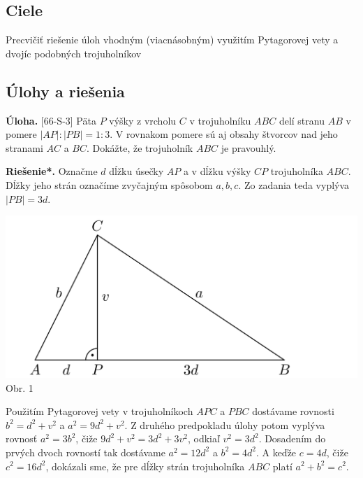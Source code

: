 \documentclass[11pt,a4paper,oneside,final]{book}
\newcommand{\ul}{\textbf{Úloha.} }
\newcommand{\rieh}{\textbf{Riešenie*.} }
\begin{document}
\subsection*{Ciele}
Precvičiť riešenie úloh vhodným (viacnásobným) využitím Pytagorovej vety a dvojíc podobných trojuholníkov

\subsection*{Úlohy a riešenia}
\begin{tcolorbox}[breakable,notitle,boxrule=0pt,colback=light-gray,colframe=light-gray]\ul [66-S-3] Päta $P$ výšky z vrcholu $C$ v trojuholníku $ABC$ delí stranu $AB$ v pomere $|AP| : |PB|= 1 : 3$. V rovnakom pomere sú aj obsahy štvorcov nad jeho stranami $AC$ a $BC$.
Dokážte, že trojuholník $ABC$ je pravouhlý.
\end{tcolorbox}

\rieh Označme $d$ dĺžku úsečky $AP$ a v dĺžku výšky $CP$ trojuholníka $ABC$. Dĺžky jeho strán označíme zvyčajným spôsobom $a, b, c$. Zo zadania teda vyplýva $|PB| = 3d$.
\begin{center}
\includegraphics{66S3}\\

Obr. 1
\end{center}
Použitím Pytagorovej vety v trojuholníkoch $APC$ a $PBC$ dostávame rovnosti $b^2= d^2 +v^2$ a $a^2 = 9d^2 +v^2$. Z druhého predpokladu úlohy potom vyplýva rovnosť $a^2 = 3b^2$, čiže $9d^2 + v^2 = 3d^2 + 3v^2$, odkiaľ $v^2 = 3d^2$. Dosadením do prvých dvoch rovností tak dostávame $a^2 = 12d^2$ a $b^2 = 4d^2$. A keďže $c = 4d$, čiže $c^2 = 16d^2$, dokázali sme, že pre dĺžky strán trojuholníka $ABC$ platí $a^2 + b^2 = c^2$.
\end{document}
